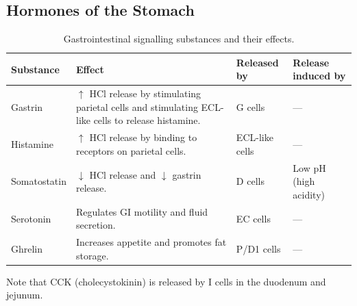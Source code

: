 \subsection{Hormones of the Stomach}
\begin{table}[htbp]
    \centering
    \footnotesize
    \setlength{\tabcolsep}{3pt}
    \renewcommand{\arraystretch}{1.25}

    \begin{tabularx}{\textwidth}{
        @{}
        >{\RaggedRight\arraybackslash}p{1.9cm}
        >{\RaggedRight\arraybackslash}X
        >{\RaggedRight\arraybackslash}p{1.8cm}
        >{\RaggedRight\arraybackslash}p{2.1cm}
        @{}
    }
        \toprule
        \textbf{Substance} &
        \textbf{Effect} &
        \textbf{Released by} &
        \textbf{Release induced by} \\
        \midrule

        Gastrin &
        \(\uparrow\) HCl release by stimulating parietal cells and stimulating ECL-like cells to release histamine. &
        G cells &
        --- \\

        Histamine &
        \(\uparrow\) HCl release by binding to receptors on parietal cells. &
        ECL-like cells &
        --- \\          

        Somatostatin &
         \(\downarrow\) HCl release and \(\downarrow\) gastrin release. &
        D cells &
        Low pH (high acidity) \\

        Serotonin &
        Regulates GI motility and fluid secretion. &
        EC cells &
        --- \\

        Ghrelin &
        Increases appetite and promotes fat storage. &
        P/D1 cells &
        --- \\

        \bottomrule
    \end{tabularx}

    \caption{Gastrointestinal signalling substances and their effects.}
    \label{tab:gi-signalling}
\end{table}

Note that CCK (cholecystokinin) is released by I cells in the duodenum and jejunum.
